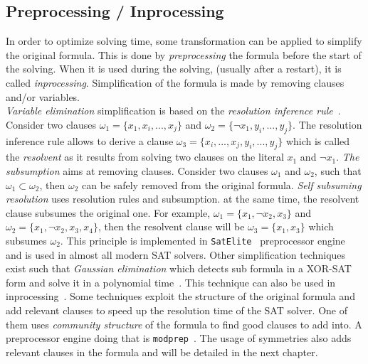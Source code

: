 \subsection{Preprocessing / Inprocessing}
In order to optimize solving time, some transformation can be applied to simplify the original formula.
This is done by \emph{preprocessing} the formula before the start of the solving.
When it is used during the solving, (usually after a restart), it is called \emph{inprocessing}.
Simplification of the formula is made by removing clauses and/or variables.\\
\emph{Variable elimination} simplification is based on the \emph{resolution inference rule}~\cite{robinson1965machine}.
Consider two clauses $\omega_1 = \{x_1, x_i, ..., x_j \}$ and $\omega_2 = \{\neg x_1, y_i, ..., y_j\}$.
The resolution inference rule allows to derive a clause $\omega_3 = \{x_i, ..., x_j, y_i, ..., y_j\}$ which is called
the \emph{resolvent} as it results from solving two clauses on the literal $x_1$ and $\neg x_1$.
\emph{The subsumption} aims at removing  clauses. Consider two clauses $\omega_1$ and $\omega_2$, such that
$\omega_1 \subset  \omega_2$, then $\omega_2$ can be safely removed from the original formula.
\emph{Self subsuming resolution} uses resolution rules and subsumption. at the same time,
the resolvent clause subsumes the original one. For example, $\omega_1 = \{x_1, \neg x_2, x_3\}$ and $\omega_2 = \{x_1, \neg x_2, x_3, x_4\}$,
 then the resolvent clause will be $\omega_3 = \{x_1, x_3\}$ which subsumes $\omega_2$. This principle
is implemented in \texttt{SatElite}~\cite{een2005effective} preprocessor engine and is used in almost all modern SAT solvers.
Other simplification techniques exist such that \emph{Gaussian elimination} which detects sub formula in a XOR-SAT
form and solve it in a polynomial time~\cite{moore2011nature}. This technique can also be used in inprocessing~\cite{soos2010enhanced}. 
Some techniques exploit the structure of the original formula and add relevant clauses to speed up the resolution
time of the SAT solver. One of them uses \textit{community structure} of the formula to find good clauses to add into.
A preprocessor engine doing that is  \texttt{modprep}~\cite{ansotegui2015using}.
The usage of symmetries also adds relevant clauses in the formula and will be detailed in the next chapter.
